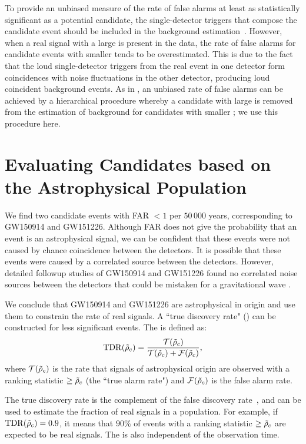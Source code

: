 To provide an unbiased measure of the rate of false alarms at least as statistically significant as a potential candidate, the single-detector triggers that compose the candidate event should be included in the background estimation~\citep{2017PhRvD..96h2002C}. However, when a real signal with a large \rankingstat{} is present in the data, the rate of false alarms for candidate events with smaller \rankingstat{} tends to be overestimated. This is due to the fact that the loud single-detector triggers from the real event in one detector form coincidences with noise fluctuations in the other detector, producing loud coincident background events. As in \cite{TheLIGOScientific:2016pea}, an unbiased rate of false alarms can be achieved by a hierarchical procedure whereby a candidate with large \rankingstat{} is removed from the estimation of background for candidates with smaller \rankingstat{}; we use this procedure here.

\section{Evaluating Candidates based on the Astrophysical Population}
\label{sec:tdr} 

We find two candidate events with
FAR $< 1$ per $50\,000$ years, corresponding to GW150914 and GW151226.
Although FAR does not give the probability that an event is an astrophysical signal,
we can be confident that these events were not caused by chance
coincidence between the detectors. It is possible that these
events were caused by a correlated source between the detectors. However, detailed followup
studies of GW150914 and GW151226 found no correlated noise sources between the detectors
that could be mistaken for a gravitational wave \citep{TheLIGOScientific:2016zmo, Abbott:2016nmj}.

We conclude that GW150914 and GW151226 are astrophysical in origin and use them to constrain the rate of real signals. A ``true discovery rate"
(\tdr{}) can be constructed for less significant events. The \tdr{} is defined as:
%
\begin{equation}
\mathrm{TDR}(\tilde{\rho}_c) = \frac{\mathcal{T}(\tilde{\rho}_c)}{\mathcal{T}(\tilde{\rho}_c) + \mathcal{F}(\tilde{\rho}_c)},
\end{equation}
%
where $\mathcal{T}(\tilde{\rho}_c)$ is the rate that signals of astrophysical origin are observed with
a ranking statistic $\geq \tilde{\rho}_c$ (the ``true alarm rate") and
$\mathcal{F}(\tilde{\rho}_c)$ is the false alarm rate.

The true discovery rate is the complement of the false discovery rate~\citep{Benjamini:1995ram},
and can be used to estimate the fraction of real signals in a population.
For example, if $\mathrm{TDR}(\tilde{\rho}_c) = 0.9$, it means that
$90\%$ of events with a ranking statistic $\geq \tilde{\rho}_c$ are expected to be real signals.  The
\tdr{} is also independent of the observation time.

